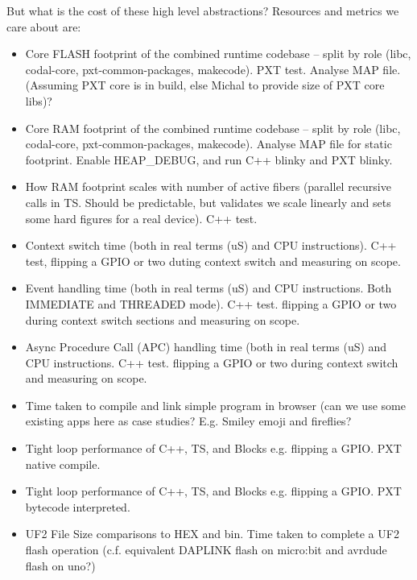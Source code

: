 But what is the cost of these high level abstractions? Resources and metrics we care about are:
\begin{itemize}
\item Core FLASH footprint of the combined runtime codebase -- 
      split by role (libc, codal-core, pxt-common-packages, makecode). PXT test. 
      Analyse MAP file. (Assuming PXT core is in build, 
      else Michal to provide size of PXT core libs)?
\item Core RAM footprint of the combined runtime codebase --
      split by role (libc, codal-core, pxt-common-packages, makecode). Analyse MAP file for static footprint. 
      Enable HEAP\_DEBUG, and run C++ blinky and PXT blinky.
\item How RAM footprint scales with number of active fibers (parallel recursive calls in TS. 
      Should be predictable, but validates we scale linearly and sets some hard figures 
      for a real device). C++ test.
\item Context switch time (both in real terms (uS) and CPU instructions). C++ test, 
      flipping a GPIO or two duting context switch and measuring on scope.
\item Event handling time (both in real terms (uS) and CPU instructions. 
      Both IMMEDIATE and THREADED mode). C++ test. flipping a GPIO or two during context 
      switch sections and measuring on scope.
\item Async Procedure Call (APC) handling time (both in real terms (uS) and CPU instructions. 
      C++ test. flipping a GPIO or two during context switch and measuring on scope.
\item Time taken to compile and link simple program in browser (can we use some existing apps 
      here as case studies? E.g. Smiley emoji and fireflies?
\item Tight loop performance of C++, TS, and Blocks e.g. flipping a GPIO. PXT native compile.
\item Tight loop performance of C++, TS, and Blocks e.g. flipping a GPIO. PXT bytecode interpreted.
\item UF2 File Size comparisons to HEX and bin. Time taken to complete a UF2 flash operation 
    (c.f. equivalent DAPLINK flash on micro:bit and avrdude flash on uno?)
\end{itemize}


